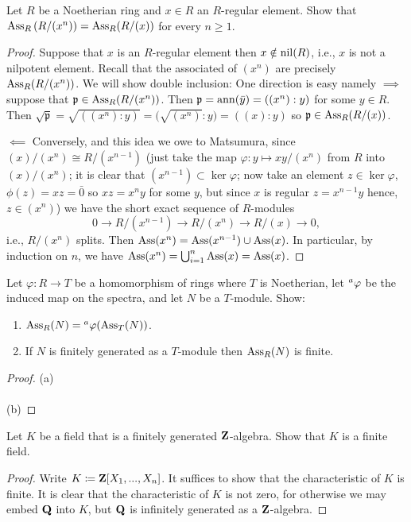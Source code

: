 \newpage
\begin{problem}
Let $R$ be a Noetherian ring and $x\in R$ an $R$-regular
element. Show that $\operatorname{Ass}_R\left(R/(x^n)\right)=\operatorname{Ass}_R(R/(x))$ for
every $n\geq 1$.
\end{problem}
\begin{proof}
Suppose that $x$ is an $R$-regular element then $x\notin\operatorname{nil}(R)$,
i.e., $x$ is not a nilpotent element. Recall that the associated
of $(x^n)$ are precisely $\operatorname{Ass}_R(R/(x^n))$. We will show double
inclusion: One direction is easy namely $\implies$ suppose that
$\mathfrak{p}\in\operatorname{Ass}_R(R/(x^n))$. Then $\mathfrak{p}=\operatorname{ann}(\bar
y)=((x^n):y)$ for some $y\in R$. Then
$\sqrt{\mathfrak{p}}=\sqrt{((x^n):y)}=\bigl(\sqrt{(x^n)}:y\bigr)=((x):y)$
so $\mathfrak{p}\in\operatorname{Ass}_R(R/(x))$.

$\impliedby$ Conversely, and this idea we owe to Matsumura,
since $(x)/(x^n)\cong R/(x^{n-1})$ (just take the map
$\varphi\colon y\mapsto xy/(x^n)$ from $R$ into $(x)/(x^n)$; it
is clear that $(x^{n-1})\subset \ker\varphi$; now take an element
$z\in\ker\varphi$, $\phi(z)=xz=\bar 0$ so $xz=x^ny$ for some $y$,
but since $x$ is regular $z=x^{n-1}y$ hence, $z\in(x^n)$) we have
the short exact sequence of $R$-modules
\[
0\longrightarrow
R/(x^{n-1})\longrightarrow
R/(x^n)\longrightarrow
R/(x)\longrightarrow
0,
\]
i.e., $R/(x^n)$ splits. Then
$\operatorname{Ass}(x^n)=\operatorname{Ass}(x^{n-1})\cup\operatorname{Ass}(x)$. In particular, by induction
on $n$, we have $\operatorname{Ass}(x^n)=\bigcup_{i=1}^n\operatorname{Ass}(x)=\operatorname{Ass}(x)$.
\end{proof}
\newpage
\begin{problem}
Let $\varphi\colon R\to T$ be a homomorphism of rings where $T$ is
Noetherian, let $\prescript{a}{}\varphi$ be the induced map on the spectra,
and let $N$ be a $T$-module. Show:
\begin{enumerate}[label=(\alph*)]
\item $\operatorname{Ass}_R(N)=\prescript{a}{}\varphi(\operatorname{Ass}_T(N))$.
\item If $N$ is finitely generated as a $T$-module then
  $\operatorname{Ass}_R(N)$ is finite.
\end{enumerate}
\end{problem}
\begin{proof}
(a)
\\\\
(b)
\end{proof}
\newpage
\begin{problem}
Let $K$ be a field that is a finitely generated
$\mathbf{Z}$-algebra. Show that $K$ is a finite field.
\end{problem}
\begin{proof}
Write $K\coloneqq\mathbf{Z}[X_1,...,X_n]$. It suffices to show that the
characteristic of $K$ is finite. It is clear that the
characteristic of $K$ is not zero, for otherwise we may embed
$\mathbf{Q}$ into $K$, but $\mathbf{Q}$ is infinitely generated as a
$\mathbf{Z}$-algebra.
\end{proof}

